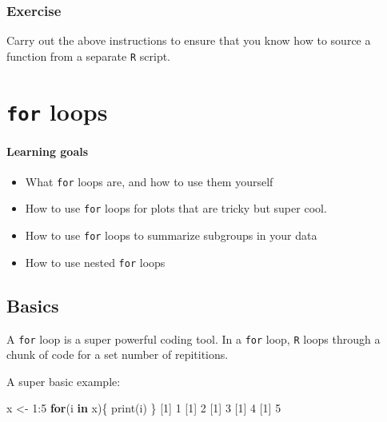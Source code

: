 \documentclass[
]{book}
\newenvironment{Shaded}{\begin{snugshade}}{\end{snugshade}}
\newcommand{\ControlFlowTok}[1]{\textcolor[rgb]{0.13,0.29,0.53}{\textbf{#1}}}
\newcommand{\DecValTok}[1]{\textcolor[rgb]{0.00,0.00,0.81}{#1}}
\newcommand{\FunctionTok}[1]{\textcolor[rgb]{0.00,0.00,0.00}{#1}}
\newcommand{\NormalTok}[1]{#1}
\newcommand{\OtherTok}[1]{\textcolor[rgb]{0.56,0.35,0.01}{#1}}
\newcommand{\SpecialCharTok}[1]{\textcolor[rgb]{0.00,0.00,0.00}{#1}}
\providecommand{\tightlist}{%
  \setlength{\itemsep}{0pt}\setlength{\parskip}{0pt}}
\begin{document}
\hypertarget{exercise-7}{%
\subsection*{Exercise}\label{exercise-7}}

Carry out the above instructions to ensure that you know how to source a function from a separate \texttt{R} script.

\hypertarget{for-loops}{%
\chapter{\texorpdfstring{\texttt{for} loops}{for loops}}\label{for-loops}}

\hypertarget{learning-goals-16}{%
\subsubsection*{Learning goals}\label{learning-goals-16}}

\begin{itemize}
\tightlist
\item
  What \texttt{for} loops are, and how to use them yourself
\item
  How to use \texttt{for} loops for plots that are tricky but super cool.
\item
  How to use \texttt{for} loops to summarize subgroups in your data
\item
  How to use nested \texttt{for} loops
\end{itemize}

\hypertarget{basics}{%
\section*{Basics}\label{basics}}

A \texttt{for} loop is a super powerful coding tool. In a \texttt{for} loop, \texttt{R} loops through a chunk of code for a set number of repititions.

A super basic example:

\begin{Shaded}
\begin{Highlighting}[]
\NormalTok{x }\OtherTok{\textless{}{-}} \DecValTok{1}\SpecialCharTok{:}\DecValTok{5}
\ControlFlowTok{for}\NormalTok{(i }\ControlFlowTok{in}\NormalTok{ x)\{}
  \FunctionTok{print}\NormalTok{(i)}
\NormalTok{\}}
\NormalTok{[}\DecValTok{1}\NormalTok{] }\DecValTok{1}
\NormalTok{[}\DecValTok{1}\NormalTok{] }\DecValTok{2}
\NormalTok{[}\DecValTok{1}\NormalTok{] }\DecValTok{3}
\NormalTok{[}\DecValTok{1}\NormalTok{] }\DecValTok{4}
\NormalTok{[}\DecValTok{1}\NormalTok{] }\DecValTok{5}
\end{Highlighting}
\end{Shaded}
\end{document}
